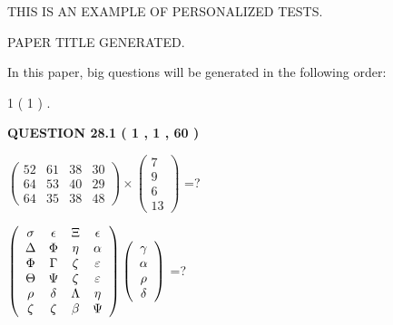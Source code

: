 \documentclass[12pt]{article}
\begin{document}
   
   
   
   
   
   
   
 \vspace{0.2in}
{\Huge  THIS IS AN EXAMPLE OF}
{\Huge  PERSONALIZED TESTS. }
   
   
 PAPER TITLE GENERATED.
   
   
   
\vspace{0.2in}
   
In this paper, big questions will be generated in the following order: 
   
   
             1 (           1 )
 .
  
\vspace{0.2in}
  
{\textbf{\Large{QUESTION
28.1 
 (           1 ,           1 ,          60 )
}}}
  
  
 
$ \left( \begin{array}{ccccccccc}
          52  & 
          61  & 
          38  & 
          30  \\ 
          64  & 
          53  & 
          40  & 
          29  \\ 
          64  & 
          35  & 
          38  & 
          48
\end{array}\right) \times
\left( \begin{array}{c}
           7  \\ 
           9  \\ 
           6  \\ 
          13
\end{array}\right) $ =?
 
 
$  %
 \left( \begin{array}
 {
 c
 c
 c
 c
 }
 \sigma & 
 \epsilon & 
                    \Xi & 
 \epsilon \\ 
 \Delta & 
 \Phi & 
 \eta & 
 \alpha \\ 
 \Phi & 
 \Gamma & 
                    \zeta & 
 \varepsilon \\ 
 \Theta & 
 \Psi & 
                    \zeta & 
 \varepsilon \\ 
 \rho & 
 \delta & 
 \Lambda & 
 \eta \\ 
                    \zeta & 
                    \zeta & 
 \beta & 
 \Psi
 \end{array} \right)
 \left( \begin{array}
 {
 c
 }
 \gamma \\ 
 \alpha \\ 
 \rho \\ 
 \delta
 \end{array} \right)
$ =?
 
\end{document}
